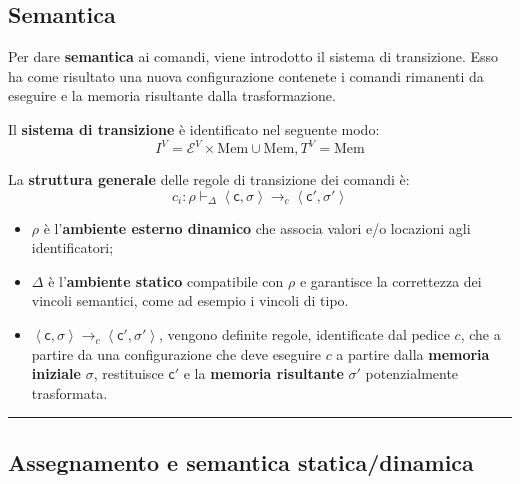 \documentclass[a4paper]{article}
\newcommand{\longline}{\noindent\rule{\textwidth}{0.4pt}}
\begin{document}
 	\subsection{Semantica}
 	
 	Per dare \textcolor{Red3}{\textbf{semantica}} ai comandi, viene introdotto il sistema di transizione. Esso ha come risultato una nuova configurazione contenete i comandi rimanenti da eseguire e la memoria risultante dalla trasformazione.\newline
 	
 	\noindent
 	\begin{boxdef}
 		Il \textcolor{Red3}{\textbf{sistema di transizione}} è identificato nel seguente modo:
 		\begin{equation*}
 			I^{V} = \mathcal{E}^{V} \times \mathrm{Mem} \cup \mathrm{Mem}, T^{V} = \mathrm{Mem}
 		\end{equation*}
 	\end{boxdef}
 	
 	\noindent
 	La \textbf{struttura generale} delle regole di transizione dei comandi è:
 	\begin{equation*}
 		c_{i} : \rho \vdash_{\Delta} \left\langle \mathsf{c}, \mathsf{\sigma} \right\rangle \longrightarrow_{c} \left\langle \mathsf{c}', \mathsf{\sigma}' \right\rangle
 	\end{equation*}
 	\begin{itemize}
 		\item $\rho$ è l'\textbf{ambiente esterno dinamico} che associa valori e/o locazioni agli identificatori;
 		
 		\item $\Delta$ è l'\textbf{ambiente statico} compatibile con $\rho$ e garantisce la correttezza dei vincoli semantici, come ad esempio i vincoli di tipo.
 		
 		\item $\left\langle \mathsf{c}, \mathsf{\sigma} \right\rangle \longrightarrow_{c} \left\langle \mathsf{c}', \mathsf{\sigma}' \right\rangle$, vengono definite regole, identificate dal pedice $c$, che a partire da una configurazione che deve eseguire $c$ a partire dalla \textbf{memoria iniziale} $\mathsf{\sigma}$, restituisce $\mathsf{c}'$ e la \textbf{memoria risultante} $\mathsf{\sigma}'$ potenzialmente trasformata.
 	\end{itemize}
 	
 	\longline
 	
 	\subsection{Assegnamento e semantica statica/dinamica}
 	
\end{document}
